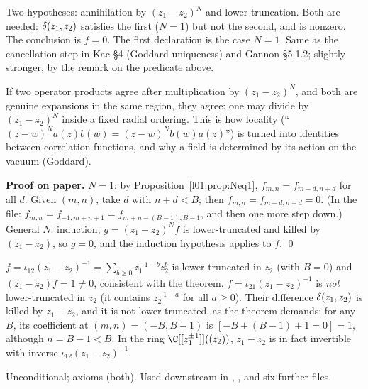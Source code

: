 \begin{dictionary}
Two hypotheses: annihilation by $(z_1-z_2)^N$ and lower truncation. Both are needed: $\delta(z_1,z_2)$ satisfies the
first ($N = 1$) but not the second, and is nonzero. The conclusion is $f = 0$. The first declaration is the case
$N = 1$. Same as the cancellation step in Kac §4 (Goddard uniqueness) and Gannon §5.1.2; slightly stronger, by
the remark on the predicate above.
\end{dictionary}

\begin{physics}
If two operator products agree after multiplication by $(z_1-z_2)^N$, and both are genuine expansions in the
same region, they agree: one may divide by $(z_1-z_2)^N$ inside a fixed radial ordering. This is how locality
(``$(z-w)^N a(z)b(w) = (z-w)^N b(w)a(z)$'') is turned into identities between correlation functions, and why a
field is determined by its action on the vacuum (Goddard).
\end{physics}

\textbf{Proof on paper.} $N = 1$: by Proposition~\ref{l01:prop:Neq1}, $f_{m,n} = f_{m-d,n+d}$ for all $d$. Given
$(m,n)$, take $d$ with $n+d<B$; then $f_{m,n} = f_{m-d,n+d} = 0$. (In the file: $f_{m,n} = f_{-1,m+n+1} =
f_{m+n-(B-1),B-1}$, and then one more step down.) General $N$: induction; $g = (z_1-z_2)^{N}f$ is lower-truncated
and killed by $(z_1-z_2)$, so $g = 0$, and the induction hypothesis applies to $f$. \qed

\begin{example}
$f = \iota_{12}(z_1-z_2)^{-1} = \sum_{b\ge0}z_1^{-1-b}z_2^{b}$ is lower-truncated in $z_2$ (with $B = 0$) and
$(z_1-z_2)f = 1\neq0$, consistent with the theorem. $f = \iota_{21}(z_1-z_2)^{-1}$ is \emph{not} lower-truncated in
$z_2$ (it contains $z_2^{-1-a}$ for all $a\ge0$). Their difference $\delta(z_1,z_2)$ is killed by $z_1-z_2$, and it is not
lower-truncated, as the theorem demands: for any $B$, its coefficient at $(m,n) = (-B,B-1)$ is
$[-B+(B-1)+1 = 0] = 1$, although $n = B-1<B$. In the ring $\C[[z_1^{\pm1}]]((z_2))$, $z_1-z_2$ is in fact invertible with
inverse $\iota_{12}(z_1-z_2)^{-1}$.
\end{example}

\begin{status}
Unconditional; axioms  (both). Used downstream in
, ,
 and six further files.
\end{status}

